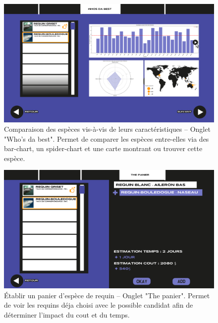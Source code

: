 \documentclass{article}
\begin{document}
\begin{figure}[!h]
	\centering
	\includegraphics[width=14.4cm]{assets/prototype/basse/onglet3}
	\caption{ Comparaison des espèces vis-à-vis de leurs caractéristiques – Onglet "Who's da best". Permet de comparer les espèces entre-elles via des bar-chart, un spider-chart et une carte montrant ou trouver cette espèce.}
    \label{onglet3}
\end{figure}

\vspace{1cm}

\begin{figure}[!h]
	\centering
	\includegraphics[width=14.4cm]{assets/prototype/basse/onglet4}
	\caption{Établir un panier d’espèce de requin – Onglet "The panier". Permet de voir les requins déja choisi avec le possible candidat afin de déterminer l'impact du cout et du temps.}
    \label{onglet4} 
\end{figure}
\end{document}
